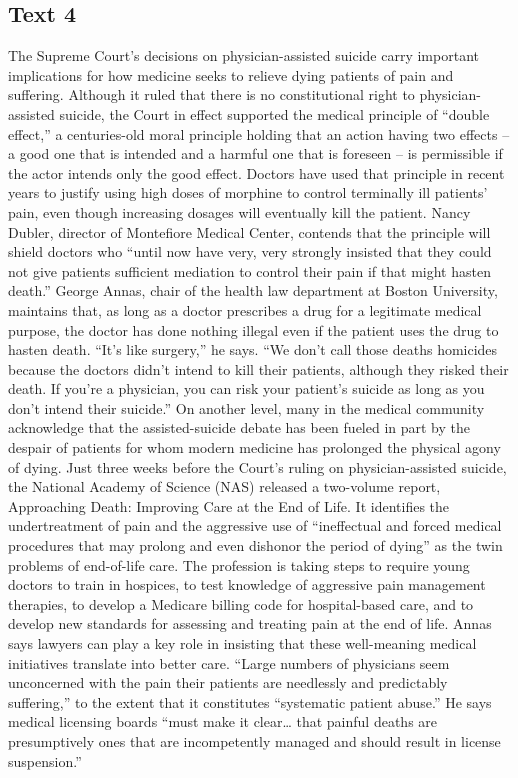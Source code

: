 \subsection{Text 4}
The Supreme Court’s decisions on physician-assisted suicide carry important implications for how medicine seeks to relieve dying patients of pain and suffering.
Although it ruled that there is no constitutional right to physician-assisted suicide, the Court in effect supported the medical principle of “double effect,” a centuries-old moral principle holding that an action having two effects -- a good one that is intended and a harmful one that is foreseen -- is permissible if the actor intends only the good effect.
Doctors have used that principle in recent years to justify using high doses of morphine to control terminally ill patients’ pain, even though increasing dosages will eventually kill the patient.
Nancy Dubler, director of Montefiore Medical Center, contends that the principle will shield doctors who “until now have very, very strongly insisted that they could not give patients sufficient mediation to control their pain if that might hasten death.”
George Annas, chair of the health law department at Boston University, maintains that, as long as a doctor prescribes a drug for a legitimate medical purpose, the doctor has done nothing illegal even if the patient uses the drug to hasten death. “It’s like surgery,” he says. “We don’t call those deaths homicides because the doctors didn’t intend to kill their patients, although they risked their death. If you’re a physician, you can risk your patient’s suicide as long as you don’t intend their suicide.”
On another level, many in the medical community acknowledge that the assisted-suicide debate has been fueled in part by the despair of patients for whom modern medicine has prolonged the physical agony of dying.
Just three weeks before the Court’s ruling on physician-assisted suicide, the National Academy of Science (NAS) released a two-volume report, Approaching Death: Improving Care at the End of Life. It identifies the undertreatment of pain and the aggressive use of “ineffectual and forced medical procedures that may prolong and even dishonor the period of dying” as the twin problems of end-of-life care.
The profession is taking steps to require young doctors to train in hospices, to test knowledge of aggressive pain management therapies, to develop a Medicare billing code for hospital-based care, and to develop new standards for assessing and treating pain at the end of life.
Annas says lawyers can play a key role in insisting that these well-meaning medical initiatives translate into better care. “Large numbers of physicians seem unconcerned with the pain their patients are needlessly and predictably suffering,” to the extent that it constitutes “systematic patient abuse.” He says medical licensing boards “must make it clear… that painful deaths are presumptively ones that are incompetently managed and should result in license suspension.”
